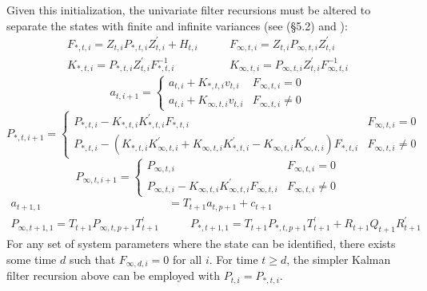 \documentclass[12pt]{article}
\begin{document}
	Given this initialization, the univariate filter recursions must be altered to separate the states with finite and infinite variances (see \cite{dk_book} (\S 5.2) and \cite{dk_fast}): 
	\begin{align*}
	 F_{*,t,i} = Z_{t,i} P_{*,t,i} Z_{t,i}^\prime + H_{t,i} &\qquad F_{\infty,t,i} = Z_{t,i} P_{\infty,t,i} Z_{t,i}^\prime\\
	K_{*,t,i} = P_{*,t,i} Z_{t,i}^\prime F_{*,t,i}^{-1} &\qquad K_{\infty,t,i} = P_{\infty,t,i} Z_{t,i}^\prime F_{\infty,t,i}^{-1}
	\end{align*}
	\begin{equation*}
	a_{t,i+1} = \begin{cases} 
	      a_{t,i} + K_{*,t,i} v_{t,i} & F_{\infty,t,i} = 0 \\
	      a_{t,i} + K_{\infty,t,i} v_{t,i} & F_{\infty,t,i} \neq 0
    \end{cases} 
    \end{equation*}
	\begin{equation*}
	P_{*,t,i+1} = \begin{cases} 
	   P_{*,t,i} - K_{*,t,i} K_{*,t,i}^\prime F_{*,t,i} & F_{\infty,t,i} = 0 \\
	   P_{*,t,i} - (K_{*,t,i} K_{\infty,t,i}^\prime + K_{\infty,t,i} K_{*,t,i}^\prime - K_{\infty,t,i} K_{\infty,t,i}^\prime) F_{*,t,i} & F_{\infty,t,i} \neq 0
	\end{cases}
	\end{equation*}
	\begin{equation*}
	P_{\infty,t,i+1} = \begin{cases} 
	   P_{\infty,t,i} & F_{\infty,t,i} = 0 \\
	   P_{\infty,t,i} - K_{\infty,t,i} K_{\infty,t,i}^\prime F_{\infty,t,i} & F_{\infty,t,i} \neq 0	   
	\end{cases} 
	\end{equation*}
	\begin{align*}
	a_{t+1,1} &= T_{t+1} a_{t, p+1} + c_{t+1} \\
	P_{\infty,t+1,1} = T_{t+1} P_{\infty,t,p+1} T_{t+1}^\prime &\qquad P_{*,t+1,1} = T_{t+1} P_{*,t,p+1} T_{t+1}^\prime + R_{t+1} Q_{t+1} R_{t+1}^\prime 
	\end{align*}
	For any set of system parameters where the state can be identified, there exists some time $d$ such that $F_{\infty,d,i} = 0$ for all $i$. For time $t \geq d$, the simpler Kalman filter recursion above can be employed with $P_{t,i} = P_{*,t,i}$. 
\end{document}
